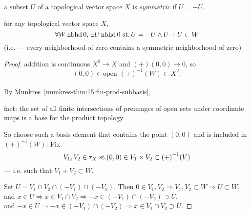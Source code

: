 \begin{defn}
  a subset $U$ of a topological vector space $X$ is
  \emph{symmetric} if ${U=-U}$.
\end{defn}

\begin{prop}\label{prop:01:A}\label{prop:01:symmetric-subnbhd}
  for any topological vector space $X$,
  \[
  \forall W\operatorname{nbhd} 0,\, \exists U\operatorname{nbhd} 0\operatorname{\,st.}
  U=-U\land U+U\subset W
  \]
  (i.e. --- every neighborhood of zero contains a symmetric
  neighborhood of zero)
\end{prop}
\begin{proof}
  addition is continuous
  ${X^2\rightarrow X}$ and ${(+)(0,0)\mapsto 0}$, so\\
  \[{(0,0)\in\text{open }{(+)}^{-1}(W)\subset X^2}.\]
  \paragraph{}
  By Munkres~\ref{munkres-thm:15:fin-prod-subbasis},
  \begin{description}
  \item{fact:} the set of all finite intersections of preimages of
    open sets under coordinate maps is a base for the product
    topology
  \end{description}

  So choose such a basis element that contains the point $(0,0)$
  and is included in ${(+)}^{-1}(W)$:
  Fix
  \[V_1, V_2\in \tau_X
  \operatorname{\,st.}
  (0,0)\in V_1\times V_2\subset {(+)}^{-1}(V)\]
  --- i.e. such that ${V_1+V_2\subset W}$.

  Set ${U=V_1\cap V_2\cap(-V_1)\cap(-V_2)}$.
  Then
  ${0\in V_1,V_2\Rightarrow V_1,V_2\subset W \Rightarrow U\subset W}$,\\
  and
  ${x\in U\Rightarrow x\in V_1\cap V_2\Rightarrow -x\in (-V_1)\cap (-V_2)\supset U}$,\\
  and
  ${-x\in U\Rightarrow-x\in (-V_1)\cap(-V_2)\Rightarrow x\in V_1\cap V_2\supset U}$.
\end{proof}


